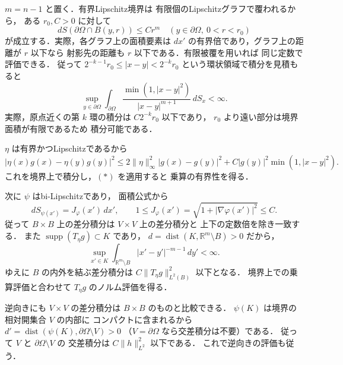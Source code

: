 \documentclass[a5paper,10pt,onecolumn]{jsarticle}
\makeatletter
\theoremstyle{mathnotetheorem}
\renewcommand{\proofname}{証明}
\renewenvironment{proof}[1][\proofname]{%
  \par\pushQED{\qed}\normalfont\topsep4\p@\@plus2\p@\relax
  \trivlist\item[\hskip\labelsep\bfseries #1]\ignorespaces
}{\popQED\endtrivlist\@endpefalse}
\newcommand{\norm}[1]{\lVert #1\rVert}
\makeatother
\begin{document}
\begin{proof}
$m=n-1$ と置く．有界Lipschitz境界は
有限個のLipschitzグラフで覆われるから，
ある $r_0,C>0$ に対して
\[
 dS(\partial\Omega\cap B(y,r))\le Cr^m
 \quad(y\in\partial\Omega,\ 0<r<r_0)
\]
が成立する．実際，各グラフ上の面積要素は
$dx'$ の有界倍であり，グラフ上の距離が $r$ 以下なら
射影先の距離も $r$ 以下である．有限被覆を用いれば
同じ定数で評価できる．
従って $2^{-k-1}r_0\le|x-y|<2^{-k}r_0$
という環状領域で積分を見積もると
\[
 \sup_{y\in\partial\Omega}
 \int_{\partial\Omega}
 \frac{\min(1,|x-y|^2)}{|x-y|^{m+1}}\,dS_x
 <\infty.
 \tag{$*$}
\]
実際，原点近くの第 $k$ 環の積分は
$C2^{-k}r_0$ 以下であり，
$r_0$ より遠い部分は境界面積が有限であるため
積分可能である．

$\eta$ は有界かつLipschitzであるから
\[
 |\eta(x)g(x)-\eta(y)g(y)|^2
 \le 2\norm\eta_\infty^2|g(x)-g(y)|^2
   +C|g(y)|^2\min(1,|x-y|^2).
\]
これを境界上で積分し，$(*)$ を適用すると
乗算の有界性を得る．

次に $\psi$ はbi-Lipschitzであり，
面積公式から
\[
 dS_{\psi(x')}=
 J_\varphi(x')\,dx',\qquad
 1\le J_\varphi(x')
 =\sqrt{1+|\nabla\varphi(x')|^2}\le C.
\]
従って $B\times B$ 上の差分積分は
$V\times V$ 上の差分積分と
上下の定数倍を除き一致する．
また $\operatorname{supp}(T_\eta g)\subset K$ であり，
$d=\operatorname{dist}(K,\mathbb R^m\setminus B)>0$
だから，
\[
 \sup_{x'\in K}\int_{\mathbb R^m\setminus B}
       |x'-y'|^{-m-1}\,dy'<\infty.
\]
ゆえに $B$ の内外を結ぶ差分積分は
$C\norm{T_\eta g}_{L^2(B)}^2$ 以下となる．
境界上での乗算評価と合わせて
$T_\eta g$ のノルム評価を得る．

逆向きにも $V\times V$ の差分積分は
$B\times B$ のものと比較できる．
$\psi(K)$ は境界の相対開集合 $V$ の内部に
コンパクトに含まれるから
$d'=\operatorname{dist}(\psi(K),
 \partial\Omega\setminus V)>0$
（$V=\partial\Omega$ なら交差積分は不要）である．
従って $V$ と $\partial\Omega\setminus V$ の
交差積分は $C\norm h_{L^2}^2$ 以下である．
これで逆向きの評価も従う．
\end{proof}
\end{document}
